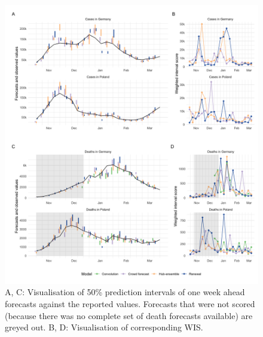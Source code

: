 \documentclass[10pt,letterpaper]{article}
\begin{document}
\begin{figure}[H]
\includegraphics[width=1\linewidth,]{../analysis/plots/figure-forecasts-1} \caption{A, C: Visualisation of 50\% prediction intervals of one week ahead forecasts against the reported values. Forecasts that were not scored (because there was no complete set of death forecasts available) are greyed out. B, D: Visualisation of corresponding WIS.}\label{fig:forecasts-and-truth-1}
\end{figure}
\end{document}
